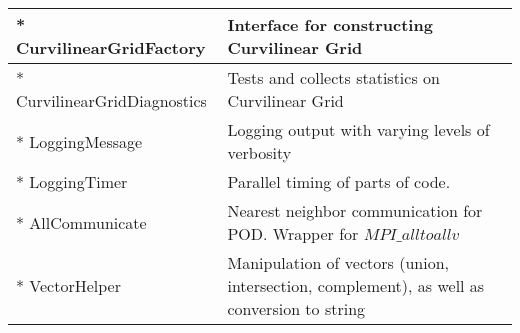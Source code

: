 \begin{tabularx}{\textwidth}{ l | X }
  * CurvilinearGridFactory            & Interface for constructing Curvilinear Grid \\ \hline
  * CurvilinearGridDiagnostics        & Tests and collects statistics on Curvilinear Grid \\ \hline
  * LoggingMessage                    & Logging output with varying levels of verbosity \\ \hline
  * LoggingTimer                      & Parallel timing of parts of code. \\ \hline
  * AllCommunicate                    & Nearest neighbor communication for POD. Wrapper for $MPI\_alltoallv$ \\ \hline
  * VectorHelper                      & Manipulation of vectors (union, intersection, complement), as well as conversion to string \\ \hline
\end{tabularx}
